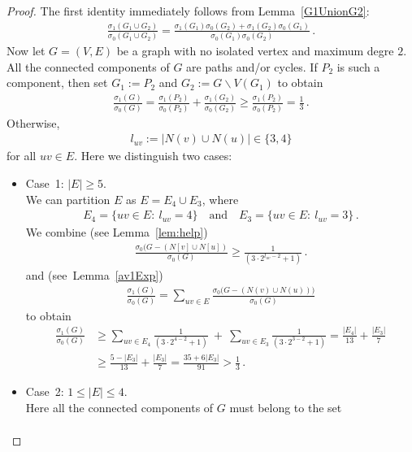 \documentclass[a4paper,12pt]{amsart}
\theoremstyle{remark}
\begin{document}
\begin{proof}
The first identity immediately follows from Lemma~\ref{G1UnionG2}:
\begin{align*}
\frac{ \sigma_1(G_1 \cup G_2)}{ \sigma_0(G_1 \cup G_2)}=\frac{\sigma_1(G_1) \sigma_0(G_2) + \sigma_1(G_2) \sigma_0(G_1)}{\sigma_0(G_1) \sigma_0(G_2)}\,.
\end{align*}
Now let $G=(V,E)$ be a graph with no isolated vertex and maximum degre $2$. All the connected components of $G$ are paths and/or cycles. If $P_2$ is such a component, then set $G_1:=P_2$ and $G_2:=G\backslash V(G_1)$ to obtain
\begin{align*}
\frac{ \sigma_1(G)}{ \sigma_0(G)}=\frac{ \sigma_1(P_2)}{ \sigma_0(P_2)}+\frac{ \sigma_1(G_2)}{ \sigma_0(G_2)}\geq \frac{ \sigma_1(P_2)}{ \sigma_0(P_2)}=\frac{1}{3}\,.
\end{align*}
Otherwise, 
\begin{align*}
l_{uv}:=|N(v)\cup N(u)|\in \{3,4\}
\end{align*}
for all $uv\in E$. Here we distinguish two cases:
\begin{itemize}
\item Case~1: $|E|\geq 5$.\\
We can partition $E$ as $E=E_4 \cup E_3$, where
\begin{align*}
E_4=\{uv\in E:~ l_{uv}=4 \}\quad \text{and} \quad E_3=\{uv\in E:~ l_{uv}=3 \}\,.
\end{align*}
We combine (see Lemma~\ref{lem:help})
\begin{align*}
\frac{\sigma_0(G-(N[v]\cup N[u])}{\sigma_0(G)}\geq \frac{1}{(3\cdot 2^{l_{uv}-2}+1)}\,.
\end{align*}
and (see~Lemma~\ref{av1Exp})
\begin{align*}
\frac{\sigma_1(G)}{\sigma_0(G)}=\sum_{uv \in E} \frac{\sigma_0\big(G-(N(v) \cup N(u))\big)}{\sigma_0(G)}
\end{align*}
to obtain
\begin{align*}
\frac{\sigma_1(G)}{\sigma_0(G)}&\geq \sum_{uv \in E_4} \frac{1}{(3\cdot 2^{4-2}+1)} ~ + ~\sum_{uv \in E_3} \frac{1}{(3\cdot 2^{3-2}+1)}=\frac{|E_4|}{13}+\frac{|E_3|}{7}\\
& \geq \frac{5-|E_3|}{13}+\frac{|E_3|}{7}=\frac{35+6|E_3|}{91}> \frac{1}{3}\,.
\end{align*}
\item Case~2: $1\leq |E|\leq 4$.\\
Here all the connected components of $G$ must belong to the set
\begin{align*}

\end{align*}
\end{itemize}
\end{proof}
\end{document}
